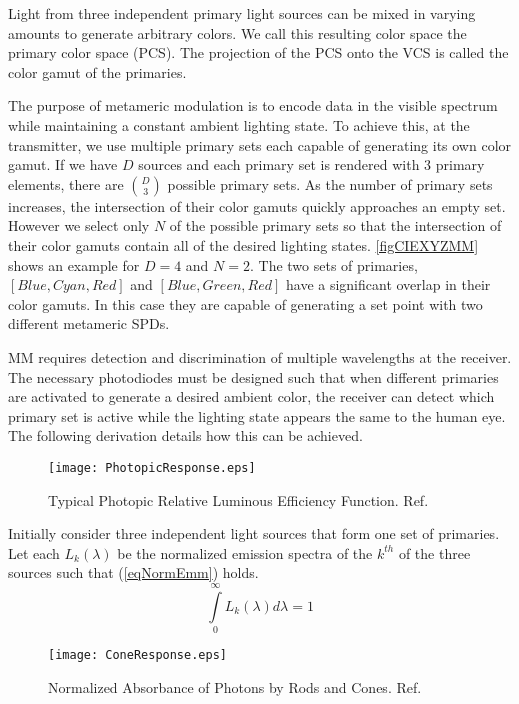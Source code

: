 Light from three independent primary light sources can be mixed in varying amounts to generate arbitrary colors. We call this resulting color space the primary color space (PCS). The projection of the PCS onto the VCS is called the color gamut of the primaries.

The purpose of metameric modulation is to encode data in the visible spectrum while maintaining a constant ambient lighting state. To achieve this, at the transmitter, we use multiple primary sets each capable of generating its own color gamut. If we have $D$ sources and each primary set is rendered with $3$ primary elements, there are ${D\choose 3}$ possible primary sets. As the number of primary sets increases, the intersection of their color gamuts quickly approaches an empty set. However we select only $N$ of the possible primary sets so that the intersection of their color gamuts contain all of the desired lighting states. \figurename{ \ref{figCIEXYZMM}} shows an example for $D=4$ and $N=2$. The two sets of primaries, $[Blue, Cyan, Red]$ and $[Blue, Green, Red]$ have a significant overlap in their color gamuts. In this case they are capable of generating a set point with two different metameric SPDs. 

MM requires detection and discrimination of multiple wavelengths at the receiver. The necessary photodiodes must be designed such that when different primaries are activated to generate a desired ambient color, the receiver can detect which primary set is active while the lighting state appears the same to the human eye. The following derivation details how this can be achieved. 
\begin{figure}
	\centering
    \texttt{[image: PhotopicResponse.eps]}
	\caption{Typical Photopic Relative Luminous Efficiency Function. Ref. \cite{jai89a}}
	\label{figPhotopicCurve}
\end{figure}

Initially consider three independent light sources that form one set of primaries. Let each $L_{k}(\lambda)$ be the normalized emission spectra of the $k^{th}$ of the three sources such that (\ref{eqNormEmm}) holds.
\begin{equation}
	\label{eqNormEmm}
	\int\limits_{0}^{\infty} L_{k}(\lambda)d\lambda = 1
\end{equation}
\begin{figure}
	\centering
    \texttt{[image: ConeResponse.eps]}
	\caption{Normalized Absorbance of Photons by Rods and Cones. Ref. \cite{wan96a}}
	\label{figConeResp}
\end{figure}

